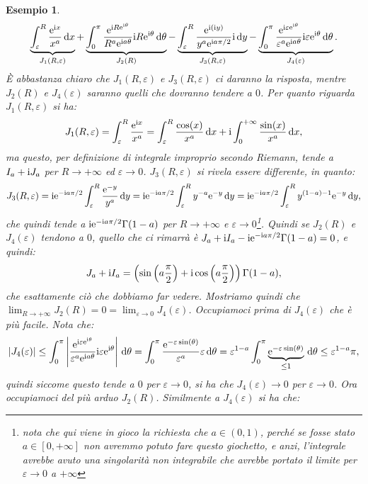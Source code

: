 \documentclass[11pt]{book}
\theoremstyle{Definizione}
\theoremstyle{TeoremaProposizioneLemmaCorollarioCongettura}
\theoremstyle{OsservazioneNotaEsempio}
\newtheorem{myes}{Esempio}[section]
\renewcommand{\i}{\textup{i}}
\newcommand{\e}{\textup{e}}
\renewcommand{\d}{\mathrm{d}}
\newcommand{\dx}{\,\d x}
\newcommand{\dy}{\,\d y}
\newcommand{\dtheta}{\, \d \theta}
\begin{document}
\begin{myes}
$$
\underbrace{\int_{\varepsilon}^{R} \frac{\e^{\i x}}{x^a}\dx}_{ J_1(R,\varepsilon)} + \underbrace{\int_0^\pi \frac{\e^{\i R\e^{\i\theta}}}{R^a \e^{\i a \theta}}\i R\e^{\i\theta}\dtheta}_{J_2(R)} - \underbrace{\int_{\varepsilon}^{R} \frac{\e^{\i(\i y)}}{y^a \e^{\i a \pi/2}} \i \dy }_{ J_3(R,\varepsilon)} - \underbrace{\int_{0}^\pi \frac{\e^{\i \varepsilon\e^{\i\theta}}}{\varepsilon^a \e^{\i a \theta}}\i\varepsilon\e^{\i\theta}\dtheta}_{J_4(\varepsilon)}.
$$
È abbastanza chiaro che $J_1(R,\varepsilon)$ e $J_3(R,\varepsilon)$ ci daranno la risposta, mentre $J_2(R)$ e $J_4(\varepsilon)$ saranno quelli che dovranno tendere a $0$. Per quanto riguarda $J_1(R,\varepsilon)$ si ha:
$$
J_1(R,\varepsilon) = \int_{\varepsilon}^{R}\frac{\e^{\i x}}{x^a} = \int_{\varepsilon}^{R} \frac{\cos(x)}{x^a}\dx + \i \int_{0}^{+\infty} \frac{\sin(x)}{x^a}\dx,
$$
ma questo, per definizione di integrale improprio secondo Riemann, tende a $I_a+\i J_a$ per $R \to +\infty$ ed $\varepsilon \to 0$. $J_3(R,\varepsilon)$ si rivela essere differente, in quanto:
$$
J_3(R,\varepsilon) = \i\e^{-\i a \pi/2} \int_{\varepsilon}^{R} \frac{\e^{-y}}{y^a} \dy = \i \e^{-\i a \pi/2} \int_{\varepsilon}^{R} y^{-a}\e^{-y}\dy = \i \e^{-\i a \pi/2} \int_{\varepsilon}^{R} y^{(1-a)-1}\e^{-y}\dy,
$$
che quindi tende a $\i \e^{-\i a \pi/2} \Gamma(1-a)$ per $R \to +\infty$ e $\varepsilon \to 0$\footnote{nota che qui viene in gioco la richiesta che $a\in (0,1)$, perché se fosse stato $a\in [0,+\infty]$ non avremmo potuto fare questo giochetto, e anzi, l'integrale avrebbe avuto una singolarità non integrabile che avrebbe portato il limite per $\varepsilon \to 0$ a $+\infty$}. Quindi se $J_2(R)$ e $J_4(\varepsilon)$ tendono a $0$, quello che ci rimarrà è $J_a+\i I_a - \i \e^{-\i a\pi/2} \Gamma(1-a) = 0$, e quindi:
$$
J_a + \i I_a = \left(\sin\left(a\frac{\pi}{2}\right)+\i\cos\left(a\frac{\pi}{2}\right)\right)\Gamma(1-a),
$$
che esattamente ciò che dobbiamo far vedere. Mostriamo quindi che $\lim_{R \to +\infty} J_2(R) = 0 = \lim_{\varepsilon \to 0} J_4(\varepsilon)$. Occupiamoci prima di $J_4(\varepsilon)$ che è più facile. Nota che:
$$
|J_4(\varepsilon)| \leq \int_0^{\pi} \left|\frac{\e^{\i \varepsilon\e^{\i\theta}}}{\varepsilon^a \e^{\i a \theta}}\i\varepsilon\e^{\i\theta}\right|\dtheta = \int_{0}^{\pi} \frac{\e^{-\varepsilon \sin(\theta)}}{\varepsilon^a}\varepsilon\dtheta
= \varepsilon^{1-a} \int_0^\pi \underbrace{\e^{-\varepsilon \sin(\theta)}}_{\leq 1}\dtheta \leq \varepsilon^{1-a} \pi,
$$
quindi siccome questo tende a $0$ per $\varepsilon \to 0$, si ha che $J_4(\varepsilon) \to 0$ per $\varepsilon \to 0$. Ora occupiamoci del più arduo $J_2(R)$. Similmente a $J_4(\varepsilon)$ si ha che:

\end{myes}
\end{document}
